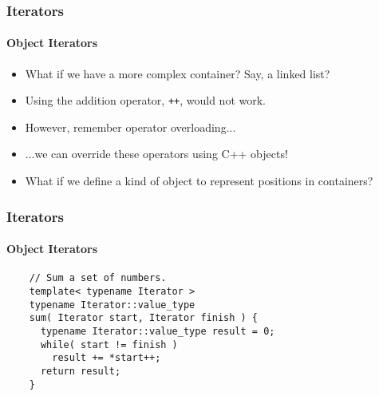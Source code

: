 \begin{frame}[fragile]
  \frametitle{Iterators}
  \framesubtitle{Object Iterators}
  \begin{itemize}
  \item What if we have a more complex container? Say, a linked list?
  \item Using the addition operator, \lstinline|++|, would not work.
  \item However, remember operator overloading...
  \item ...we can override these operators using C++ objects!
  \item What if we define a kind of object to represent positions in containers?
  \end{itemize}
\end{frame}

\begin{frame}[fragile]
  \frametitle{Iterators}
  \framesubtitle{Object Iterators}
  \begin{example}
    \begin{lstlisting}
    // Sum a set of numbers.
    template< typename Iterator >
    typename Iterator::value_type
    sum( Iterator start, Iterator finish ) {
      typename Iterator::value_type result = 0;
      while( start != finish )
        result += *start++;
      return result;
    }
    \end{lstlisting}
  \end{example}
\end{frame}

